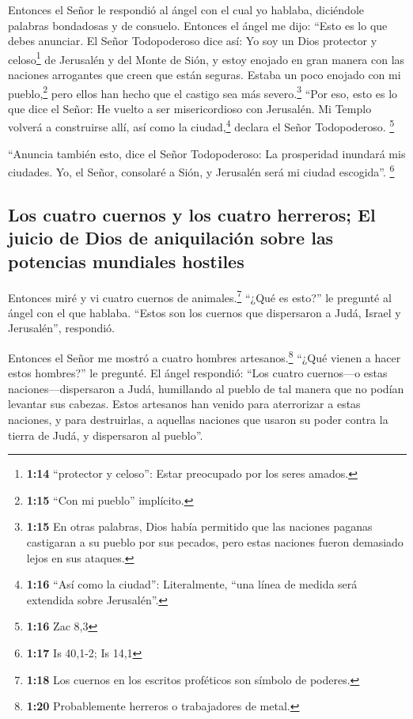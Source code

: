  Entonces el Señor le respondió al ángel con el cual yo
hablaba, diciéndole palabras bondadosas y de consuelo. 
Entonces el ángel me dijo: ``Esto es lo que debes anunciar. El Señor
Todopoderoso dice así: Yo soy un Dios protector y celoso\footnote{\textbf{1:14}
  ``protector y celoso'': Estar preocupado por los seres amados.} de
Jerusalén y del Monte de Sión,  y estoy enojado en gran
manera con las naciones arrogantes que creen que están seguras. Estaba
un poco enojado con mi pueblo,\footnote{\textbf{1:15} ``Con mi pueblo''
  implícito.} pero ellos han hecho que el castigo sea más
severo.\footnote{\textbf{1:15} En otras palabras, Dios había permitido
  que las naciones paganas castigaran a su pueblo por sus pecados, pero
  estas naciones fueron demasiado lejos en sus ataques.} 
``Por eso, esto es lo que dice el Señor: He vuelto a ser misericordioso
con Jerusalén. Mi Templo volverá a construirse allí, así como la
ciudad,\footnote{\textbf{1:16} ``Así como la ciudad'': Literalmente,
  ``una línea de medida será extendida sobre Jerusalén''.} declara el
Señor Todopoderoso. \footnote{\textbf{1:16} Zac 8,3}

 ``Anuncia también esto, dice el Señor Todopoderoso: La
prosperidad inundará mis ciudades. Yo, el Señor, consolaré a Sión, y
Jerusalén será mi ciudad escogida''. \footnote{\textbf{1:17} Is 40,1-2;
  Is 14,1}

\hypertarget{los-cuatro-cuernos-y-los-cuatro-herreros-el-juicio-de-dios-de-aniquilaciuxf3n-sobre-las-potencias-mundiales-hostiles}{%
\subsection{Los cuatro cuernos y los cuatro herreros; El juicio de Dios
de aniquilación sobre las potencias mundiales
hostiles}\label{los-cuatro-cuernos-y-los-cuatro-herreros-el-juicio-de-dios-de-aniquilaciuxf3n-sobre-las-potencias-mundiales-hostiles}}

 Entonces miré y vi cuatro cuernos de
animales.\footnote{\textbf{1:18} Los cuernos en los escritos proféticos
  son símbolo de poderes.}  ``¿Qué es esto?'' le pregunté
al ángel con el que hablaba. ``Estos son los cuernos que dispersaron a
Judá, Israel y Jerusalén'', respondió.

 Entonces el Señor me mostró a cuatro hombres
artesanos.\footnote{\textbf{1:20} Probablemente herreros o trabajadores
  de metal.}  ``¿Qué vienen a hacer estos hombres?'' le
pregunté. El ángel respondió: ``Los cuatro cuernos---o estas
naciones---dispersaron a Judá, humillando al pueblo de tal manera que no
podían levantar sus cabezas. Estos artesanos han venido para aterrorizar
a estas naciones, y para destruirlas, a aquellas naciones que usaron su
poder contra la tierra de Judá, y dispersaron al pueblo''.

